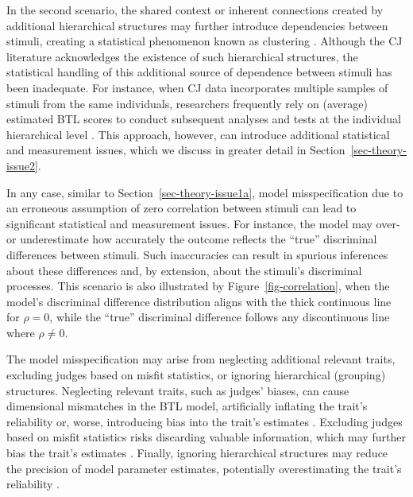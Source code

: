 \documentclass[
  authoryear,
  review,
  1p]{elsarticle}
\begin{document}
In the second scenario, the shared context or inherent connections
created by additional hierarchical structures may further introduce
dependencies between stimuli, creating a statistical phenomenon known as
clustering \citep{Everitt_et_al_2010}. Although the CJ literature
acknowledges the existence of such hierarchical structures, the
statistical handling of this additional source of dependence between
stimuli has been inadequate. For instance, when CJ data incorporates
multiple samples of stimuli from the same individuals, researchers
frequently rely on (average) estimated BTL scores to conduct subsequent
analyses and tests at the individual hierarchical level
\citep{Bramley_et_al_2019, Boonen_et_al_2020, Bouwer_et_al_2023, vanDaal_et_al_2017, Jones_et_al_2019, Gijsen_et_al_2021}.
This approach, however, can introduce additional statistical and
measurement issues, which we discuss in greater detail in
Section~\ref{sec-theory-issue2}.

In any case, similar to Section~\ref{sec-theory-issue1a}, model
misspecification due to an erroneous assumption of zero correlation
between stimuli can lead to significant statistical and measurement
issues. For instance, the model may over- or underestimate how
accurately the outcome reflects the ``true'' discriminal differences
between stimuli. Such inaccuracies can result in spurious inferences
about these differences and, by extension, about the stimuli's
discriminal processes. This scenario is also illustrated by
Figure~\ref{fig-correlation}, when the model's discriminal difference
distribution aligns with the thick continuous line for \(\rho=0\), while
the ``true'' discriminal difference follows any discontinuous line where
\(\rho \neq 0\).

The model misspecification may arise from neglecting additional relevant
traits, excluding judges based on misfit statistics, or ignoring
hierarchical (grouping) structures. Neglecting relevant traits, such as
judges' biases, can cause dimensional mismatches in the BTL model,
artificially inflating the trait's reliability
\citep[pp.~341]{Hoyle_et_al_2023} or, worse, introducing bias into the
trait's estimates \citep{Ackerman_1989}. Excluding judges based on
misfit statistics risks discarding valuable information, which may
further bias the trait's estimates
\citep[chap.~12]{Zimmerman_1994, McElreath_2020}. Finally, ignoring
hierarchical structures may reduce the precision of model parameter
estimates, potentially overestimating the trait's reliability
\citep[pp.~482]{Hoyle_et_al_2023}.
\end{document}
